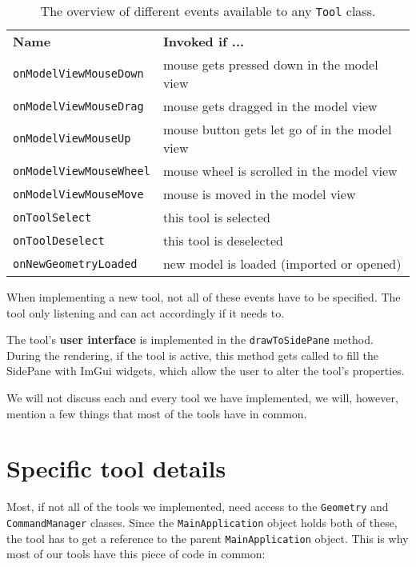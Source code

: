\begin{table}[H]
\centering
\begin{tabular}{ll}
\textbf{Name}         & \textbf{Invoked if ...}                       \\
\texttt{onModelViewMouseDown}  & mouse gets pressed down in the model view     \\
\texttt{onModelViewMouseDrag}  & mouse gets dragged in the model view          \\
\texttt{onModelViewMouseUp}    & mouse button gets let go of in the model view \\
\texttt{onModelViewMouseWheel} & mouse wheel is scrolled in the model view     \\
\texttt{onModelViewMouseMove}  & mouse is moved in the model view              \\
\texttt{onToolSelect}          & this tool is selected                         \\
\texttt{onToolDeselect}        & this tool is deselected                       \\
\texttt{onNewGeometryLoaded}   & new model is loaded (imported or opened)
\end{tabular}
\label{tab:events}
\caption{The overview of different events available to any \texttt{Tool} class.}
\end{table}

When implementing a new tool, not all of these events have to be specified. The tool only listening and can act accordingly if it needs to.

The tool's \textbf{user interface} is implemented in the \texttt{drawToSidePane} method. During the rendering, if the tool is active, this method gets called to fill the SidePane with ImGui widgets, which allow the user to alter the tool's properties.

We will not discuss each and every tool we have implemented, we will, however, mention a few things that most of the tools have in common.

\section{Specific tool details}

Most, if not all of the tools we implemented, need access to the \texttt{Geometry} and \texttt{CommandManager} classes. Since the \texttt{MainApplication} object holds both of these, the tool has to get a reference to the parent \texttt{MainApplication} object. This is why most of our tools have this piece of code in common:

